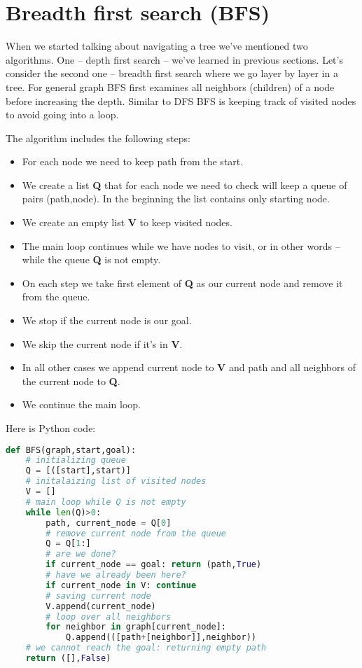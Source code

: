 \section{Breadth first search (BFS)}

When we started talking about navigating a tree we've mentioned
two algorithms. One -- depth first search -- we've learned in
previous sections. Let's consider the second one -- breadth first
search where we go layer by layer in a tree. For general graph
BFS first examines all neighbors (children) of a node before
increasing the depth. Similar to DFS BFS is keeping track of
visited nodes to avoid going into a loop.

The algorithm includes the following steps:

\begin{itemize}
\item For each node we need to keep path from the start.
\item We create a list \textbf{Q} that for each node we need to check
will keep a queue of pairs (path,node). In the beginning the list contains
only starting node.
\item We create an empty list \textbf{V} to keep visited nodes.
\item The main loop continues while we have nodes to visit, or
in other words -- while the queue \textbf{Q} is not empty.
\item On each step we take first element of \textbf{Q} as our
current node and remove it from the queue.
\item We stop if the current node is our goal.
\item We skip the current node if it's in \textbf{V}.
\item In all other cases we append current node to \textbf{V} and
path and all neighbors of the current node to \textbf{Q}.
\item We continue the main loop.
\end{itemize}

Here is Python code:

\begin{lstlisting}[language=Python,style=codelst,caption={Python: Breadth first search}]
def BFS(graph,start,goal):
    # initializing queue
    Q = [([start],start)]
    # initalaizing list of visited nodes
    V = []
    # main loop while Q is not empty
    while len(Q)>0:
        path, current_node = Q[0]
        # remove current node from the queue
        Q = Q[1:]
        # are we done?
        if current_node == goal: return (path,True)
        # have we already been here?
        if current_node in V: continue
        # saving current node
        V.append(current_node)
        # loop over all neighbors
        for neighbor in graph[current_node]:
            Q.append(([path+[neighbor]],neighbor))
    # we cannot reach the goal: returning empty path
    return ([],False)
\end{lstlisting}

